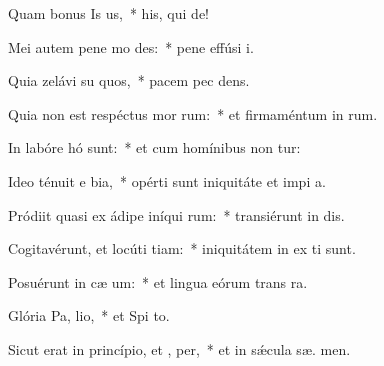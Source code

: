 \item Quam bonus Is us,~* his, qui   de!
\item Mei autem pene mo  des:~* pene effúsi   i.
\item Quia zelávi su quos,~* pacem pec dens.
\item Quia non est respéctus mor rum:~* et firmaméntum in  rum.
\item In labóre hó  sunt:~* et cum homínibus non tur:
\item Ideo ténuit e bia,~* opérti sunt iniquitáte et impi a.
\item Pródiit quasi ex ádipe iníqui rum:~* transiérunt in  dis.
\item Cogitavérunt, et locúti  tiam:~* iniquitátem in ex ti sunt.
\item Posuérunt in cæ  um:~* et lingua eórum trans  ra.
\item Glória Pa,  lio,~* et Spi to.
\item Sicut erat in princípio, et ,  per,~* et in sǽcula sæ. men.

